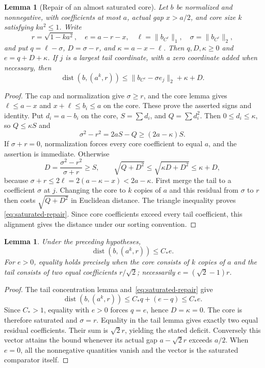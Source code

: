 \documentclass[11pt]{article}
\newtheorem{lemma}[theorem]{Lemma}
\theoremstyle{remark}\newtheorem{remark}[theorem]{Remark}
\begin{document}
\begin{lemma}[Repair of an almost saturated core]\label{lem:saturated-repair}
Let $b$ be normalized and nonnegative, with coefficients at most $a$,
actual gap $x>a/2$, and core size $k$ satisfying $ka^2\le1$.
Write
\[
 r=\sqrt{1-ka^2},\quad e=a-r-x,
 \quad \ell=\|b_{C^c}\|_1,\quad \sigma=\|b_{C^c}\|_2,
\]
and put $q=\ell-\sigma$, $D=\sigma-r$, and $\kappa=a-x-\ell$.
Then $q,D,\kappa\ge0$ and $e=q+D+\kappa$.
If $j$ is a largest tail coordinate, with a zero coordinate added when
necessary, then
\begin{equation}\label{eq:saturated-repair}
 \operatorname{dist}(b,(a^k,r))
 \le \|b_{C^c}-\sigma e_j\|_2+\kappa+D.
\end{equation}
\end{lemma}
\begin{proof}
The cap and normalization give $\sigma\ge r$, and the core lemma gives
$\ell\le a-x$ and $x+\ell\le b_i\le a$ on the core. These prove
the asserted signs and identity. Put $d_i=a-b_i$ on the core,
$S=\sum d_i$, and $Q=\sum d_i^2$. Then $0\le d_i\le\kappa$,
so $Q\le\kappa S$ and
\[
 \sigma^2-r^2=2aS-Q\ge(2a-\kappa)S.
\]
If $\sigma+r=0$, normalization forces every core coefficient to equal
$a$, and the assertion is immediate. Otherwise
\[
 D=\frac{\sigma^2-r^2}{\sigma+r}\ge S,
 \qquad
 \sqrt{Q+D^2}\le\sqrt{\kappa D+D^2}\le\kappa+D,
\]
because $\sigma+r\le2\ell=2(a-\kappa-x)<2a-\kappa$.
First merge the tail to a coefficient $\sigma$ at $j$. Changing the core
to $k$ copies of $a$ and this residual from $\sigma$ to $r$ then costs
$\sqrt{Q+D^2}$ in Euclidean distance. The triangle inequality proves
\eqref{eq:saturated-repair}. Since core coefficients exceed every tail
coefficient, this alignment gives the distance under our sorting convention.
\end{proof}

\begin{lemma}\label{lem:saturated-gap-stability}
Under the preceding hypotheses,
\[
 \operatorname{dist}(b,(a^k,r))\le C_*e.
\]
For $e>0$, equality holds precisely when the core consists of $k$ copies
of $a$ and the tail consists of two equal coefficients $r/\sqrt2$;
necessarily $e=(\sqrt2-1)r$.
\end{lemma}
\begin{proof}
The tail concentration lemma and~\eqref{eq:saturated-repair} give
\[
 \operatorname{dist}(b,(a^k,r))\le C_*q+(e-q)\le C_*e.
\]
Since $C_*>1$, equality with $e>0$ forces $q=e$, hence $D=\kappa=0$.
The core is therefore saturated and $\sigma=r$. Equality in the tail
lemma gives exactly two equal residual coefficients. Their sum is
$\sqrt2r$, yielding the stated deficit. Conversely this vector attains
the bound whenever its actual gap $a-\sqrt2r$ exceeds $a/2$.
When $e=0$, all the nonnegative quantities vanish and the vector is the
saturated comparator itself.
\end{proof}
\end{document}
